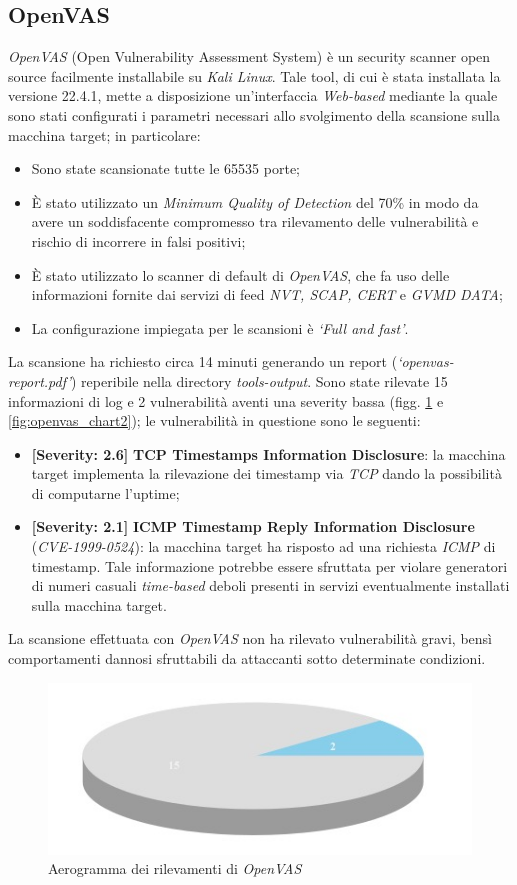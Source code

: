 \subsection{OpenVAS}
\emph{OpenVAS} (Open Vulnerability Assessment System) è un security scanner open source facilmente installabile su \emph{Kali Linux}. Tale tool, di cui è stata installata la versione 22.4.1, mette a disposizione un'interfaccia \emph{Web-based} mediante la quale sono stati configurati i parametri necessari allo svolgimento della scansione sulla macchina target; in particolare:
\begin{itemize} 
    \item Sono state scansionate tutte le 65535 porte;
    \item È stato utilizzato un \emph{Minimum Quality of Detection} del 70\% in modo da avere un soddisfacente compromesso tra rilevamento delle vulnerabilità e rischio di incorrere in falsi positivi;
    \item È stato utilizzato lo scanner di default di \emph{OpenVAS}, che fa uso delle informazioni fornite dai servizi di feed \emph{NVT, SCAP, CERT} e \emph{GVMD DATA};
    \item La configurazione impiegata per le scansioni è \emph{`Full and fast'}.
\end{itemize}
La scansione ha richiesto circa 14 minuti generando un report (\emph{`openvas-report.pdf'}) reperibile nella directory \emph{tools-output}. Sono state rilevate 15 informazioni di log e 2 vulnerabilità aventi una severity bassa (figg. \ref{fig:openvas_chart1} e \ref{fig:openvas_chart2}); le vulnerabilità in questione sono le seguenti:
\begin{itemize}
    \item \textbf{[Severity: 2.6]} \textbf{TCP Timestamps Information Disclosure}: la macchina target implementa la rilevazione dei timestamp via \emph{TCP} dando la possibilità di computarne l'uptime;
    \item \textbf{[Severity: 2.1]} \textbf{ICMP Timestamp Reply Information Disclosure} (\emph{CVE-1999-0524}): la macchina target ha risposto ad una richiesta \emph{ICMP} di timestamp. Tale informazione potrebbe essere sfruttata per violare generatori di numeri casuali \emph{time-based} deboli presenti in servizi eventualmente installati sulla macchina target.
\end{itemize}
La scansione effettuata con \emph{OpenVAS} non ha rilevato vulnerabilità gravi, bensì comportamenti dannosi sfruttabili da attaccanti sotto determinate condizioni.
\begin{figure}[h]
    \centering
    \includegraphics[scale=0.5]{capitoli/images/openvas-chart1.jpeg}
    \caption{Aerogramma dei rilevamenti di \emph{OpenVAS}}
    \label{fig:openvas_chart1}
\end{figure}
